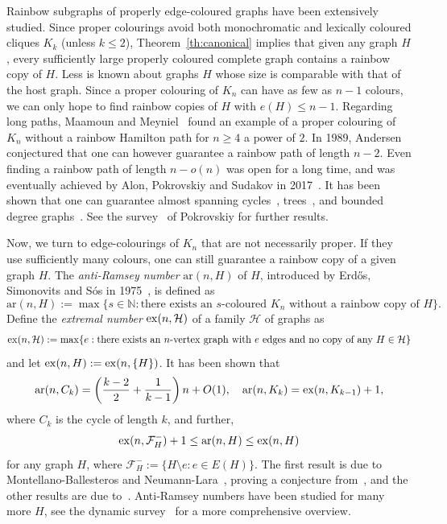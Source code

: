 \documentclass[a4paper, 12pt]{article}
\numberwithin{equation}{section}
\def\ar{{\mathrm{ar}}}
\newcommand{\mc}[1]{\mathcal{#1}}
\begin{document}
Rainbow subgraphs of properly edge-coloured graphs have been extensively studied. 
Since proper colourings avoid both  
monochromatic and
lexically coloured cliques $K_k$ (unless $k\le 2$),
Theorem~\ref{th:canonical}  implies that given any graph $H$, every sufficiently large properly coloured complete graph  contains a rainbow copy of $H$.
Less is known about graphs $H$ whose size is comparable with that of the host graph.
Since a proper colouring of $K_n$ can have as few as $n-1$ colours, we can only hope to find rainbow copies of $H$ with $e(H) \leq n-1$.
Regarding long paths, Maamoun and Meyniel~\cite{MaamounMeyniel} found an example of a proper colouring of $K_n$ without a rainbow Hamilton path for $n \geq 4$ a power of $2$. In 1989, Andersen~\cite{Andersen} conjectured that one can however guarantee a rainbow path of length $n-2$.
Even finding a rainbow path of length $n-o(n)$ was open for a long time, and was eventually achieved by Alon, Pokrovskiy and Sudakov in 2017~\cite{AlonPokrovskiySudakov}.
It has been shown that one can guarantee almost spanning cycles~\cite{AlonPokrovskiySudakov}, trees~\cite{MontgomeryPokrovskiySudakov}, and bounded degree graphs~\cite{EhardGlockJoos}. See the survey~\cite{PokrovskiySurvey} of Pokrovskiy for further results.

Now, we turn to edge-colourings of $K_n$ that are not necessarily proper. If they use sufficiently many colours, one can still guarantee a rainbow copy of a given graph $H$. The \emph{anti-Ramsey number} $\ar(n,H)$ of $H$, introduced by Erd\H{o}s, Simonovits and S\'os in 1975~\cite{ErdosSimonovitsSos}, is defined as$$
\ar(n,H) := \max\{s \in \mathbb{N}: \text{there exists an }s\text{-coloured }K_n\text{ without a rainbow copy of }H\}.
$$
Define the \emph{extremal number} ${\rm ex}(n,\mc{H})$ of a family $\mc{H}$ of graphs as
$$
{\rm ex}(n,\mc{H}) := \max\{e: \text{there exists an $n$-vertex graph  with }e\text{ edges and no copy of any }H \in \mc{H}\}
$$
and let ${\rm ex}(n,H) := {\rm ex}(n,\{H\})$.
It has been shown that
\begin{gather}
\label{eq:exantiramsey1}
\ar(n,C_k) = \left(\frac{k-2}{2}+\frac{1}{k-1}\right)n+O(1),\quad
\ar(n,K_k) = {\rm ex}(n,K_{k-1})+1,
\end{gather}
where $C_k$ is the cycle of length $k$, and further,
\begin{gather}
\label{eq:exantiramsey}
{\rm ex}(n,\mc{F}^-_H)+1 \leq \ar(n,H) \leq {\rm ex}(n,H)
\end{gather}
for any graph $H$, where $\mc{F}^-_H := \{H \setminus e: e \in E(H)\}$.
The first result is due to Montellano-Ballesteros and Neumann-Lara~\cite{MontellanoNeumann}, proving a conjecture from~\cite{ErdosSimonovitsSos},
and the other results are due to~\cite{ErdosSimonovitsSos}.
Anti-Ramsey numbers have been studied for many more $H$, see the dynamic survey~\cite{RainbowSurvey} for a more comprehensive overview.
\end{document}
